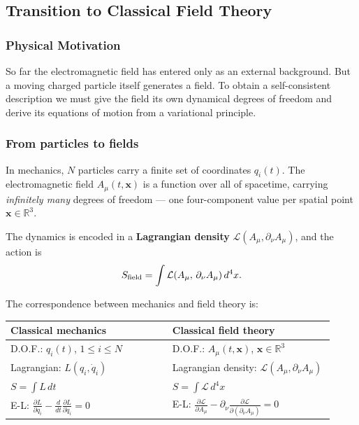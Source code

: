 \subsection{Transition to Classical Field Theory}\label{subsec:CFT}

\subsubsection*{Physical Motivation}
So far the electromagnetic field has entered only as an external background.  But a moving charged particle itself generates a field.  To obtain a self-consistent description we must give the field its own dynamical degrees of freedom and derive its equations of motion from a variational principle.

\subsubsection*{From particles to fields}

In mechanics, $N$ particles carry a finite set of coordinates $q_i(t)$.  The electromagnetic field $A_\mu(t,\mathbf{x})$ is a function over all of spacetime, carrying \emph{infinitely many} degrees of freedom — one four-component value per spatial point $\mathbf{x}\in\mathbb{R}^3$.

The dynamics is encoded in a \textbf{Lagrangian density} $\mathcal{L}(A_\mu, \partial_\nu A_\mu)$, and the action is
\begin{equation}\label{eq:S-field}
  S_{\rm field} = \int \mathcal{L}(A_\mu,\,\partial_\nu A_\mu)\,d^4x.
\end{equation}

\noindent The correspondence between mechanics and field theory is:

\begin{center}
\renewcommand{\arraystretch}{1.5}
\begin{tabular}{p{0.46\linewidth} p{0.46\linewidth}}
  \hline
  \textbf{Classical mechanics} & \textbf{Classical field theory} \\
  \hline
  D.O.F.: $q_i(t)$, \;$1\le i\le N$ & D.O.F.: $A_\mu(t,\mathbf{x})$, \;$\mathbf{x}\in\mathbb{R}^3$ \\
  Lagrangian: $L(q_i,\dot{q}_i)$ & Lagrangian density: $\mathcal{L}(A_\mu,\partial_\nu A_\mu)$ \\
  $S = \displaystyle\int L\,dt$ & $S = \displaystyle\int \mathcal{L}\,d^4x$ \\
  E-L: $\displaystyle\frac{\partial L}{\partial q_i} - \frac{d}{dt}\frac{\partial L}{\partial \dot{q}_i} = 0$
  & E-L: $\displaystyle\frac{\partial \mathcal{L}}{\partial A_\mu} - \partial_\nu\frac{\partial \mathcal{L}}{\partial(\partial_\nu A_\mu)} = 0$ \\
  \hline
\end{tabular}
\end{center}

